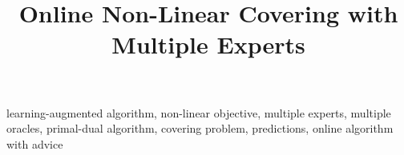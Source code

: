 \documentclass[anon,12pt]{alt2025} %
\title[Online Non-Linear Covering with Multiple Experts]{Online Non-Linear Covering with Multiple Experts}
\begin{document}
\maketitle



\begin{keywords}
    learning-augmented algorithm, non-linear objective, multiple experts, multiple oracles, primal-dual algorithm, covering problem, predictions, online algorithm with advice
\end{keywords}







\clearpage



\clearpage

\appendix
%

%
\clearpage

\clearpage

\clearpage

\end{document}
